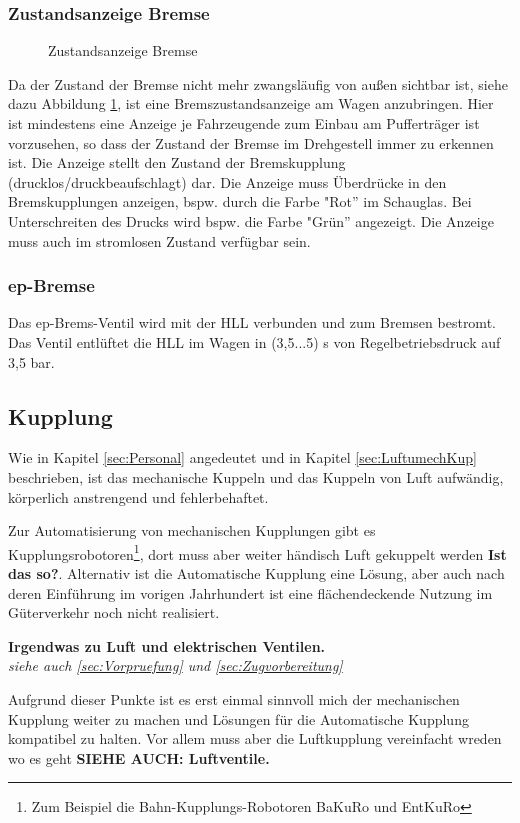 \subsubsection{Zustandsanzeige Bremse}
\begin{figure}[htbp]
    \centering
    
    \caption{Zustandsanzeige Bremse \cite{ETR_3}}
    \label{fig:ZustandBremse}
\end{figure} 
Da der Zustand der Bremse nicht mehr zwangsläufig von außen sichtbar ist, siehe dazu Abbildung \ref{fig:ZustandBremse}, ist eine Bremszustandsanzeige am Wagen anzubringen. Hier ist mindestens eine Anzeige je Fahrzeugende zum Einbau am Pufferträger ist vorzusehen, so dass
 der Zustand der Bremse im Drehgestell immer zu erkennen ist. Die Anzeige stellt den Zustand der Bremskupplung (drucklos/druckbeaufschlagt) dar. Die Anzeige muss Überdrücke %
 in den Bremskupplungen anzeigen, bspw. durch die Farbe "Rot'' im Schauglas. Bei Unterschreiten des Drucks wird bspw. die Farbe "Grün'' angezeigt. Die Anzeige muss auch im stromlosen Zustand verfügbar sein.

\subsubsection{ep-Bremse}
Das ep-Brems-Ventil wird mit der HLL verbunden und zum Bremsen bestromt. Das Ventil entlüftet die HLL im Wagen in (3,5...5) s von Regelbetriebsdruck auf 3,5 bar.

\subsection{Kupplung}
Wie in Kapitel \ref{sec:Personal} angedeutet und in Kapitel \ref{sec:LuftumechKup} beschrieben, ist das mechanische Kuppeln und das Kuppeln von Luft aufwändig, körperlich anstrengend und fehlerbehaftet. \par
Zur Automatisierung von mechanischen Kupplungen gibt es Kupplungsrobotoren\footnote{Zum Beispiel die Bahn-Kupplungs-Robotoren BaKuRo und EntKuRo}, dort muss aber weiter händisch Luft gekuppelt werden \textbf{Ist das so?}. Alternativ ist die Automatische Kupplung eine Lösung, aber auch nach deren Einführung im vorigen Jahrhundert ist eine flächendeckende Nutzung im Güterverkehr noch nicht realisiert.\par
\textbf{Irgendwas zu Luft und elektrischen Ventilen.}\\
\textit{siehe auch \ref{sec:Vorpruefung} und \ref{sec:Zugvorbereitung}}
\par
Aufgrund dieser Punkte ist es erst einmal sinnvoll mich der mechanischen Kupplung weiter zu machen und Lösungen für die Automatische Kupplung kompatibel zu halten. Vor allem muss aber die Luftkupplung vereinfacht wreden wo es geht \textbf{ SIEHE AUCH: Luftventile.}

